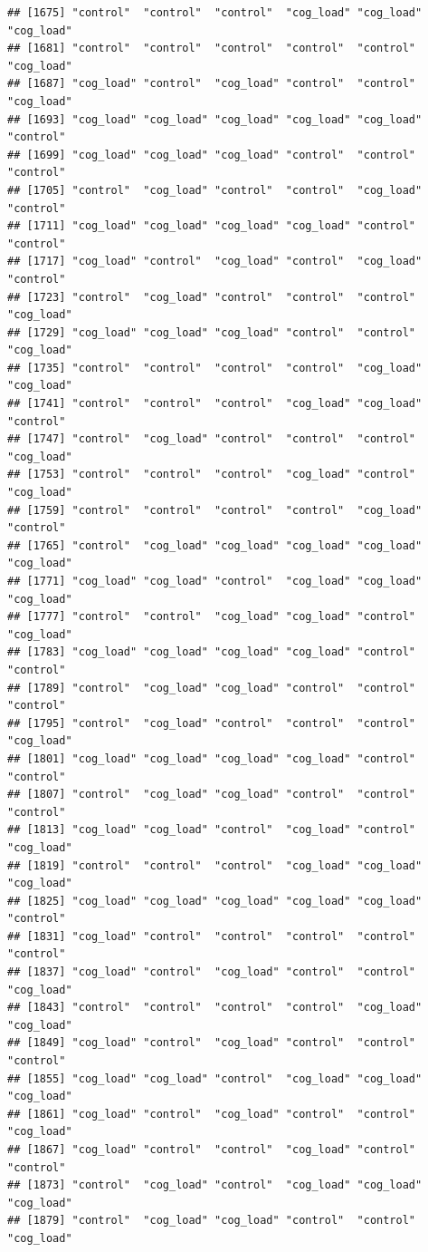 \documentclass[
  american,
  man,floatsintext]{apa7}
\begin{document}
\begin{verbatim}
## [1675] "control"  "control"  "control"  "cog_load" "cog_load" "cog_load"
## [1681] "control"  "control"  "control"  "control"  "control"  "cog_load"
## [1687] "cog_load" "control"  "cog_load" "control"  "control"  "cog_load"
## [1693] "cog_load" "cog_load" "cog_load" "cog_load" "cog_load" "control" 
## [1699] "cog_load" "cog_load" "cog_load" "control"  "control"  "control" 
## [1705] "control"  "cog_load" "control"  "control"  "cog_load" "control" 
## [1711] "cog_load" "cog_load" "cog_load" "cog_load" "control"  "control" 
## [1717] "cog_load" "control"  "cog_load" "control"  "cog_load" "control" 
## [1723] "control"  "cog_load" "control"  "control"  "control"  "cog_load"
## [1729] "cog_load" "cog_load" "cog_load" "control"  "control"  "cog_load"
## [1735] "control"  "control"  "control"  "control"  "cog_load" "cog_load"
## [1741] "control"  "control"  "control"  "cog_load" "cog_load" "control" 
## [1747] "control"  "cog_load" "control"  "control"  "control"  "cog_load"
## [1753] "control"  "control"  "control"  "cog_load" "control"  "cog_load"
## [1759] "control"  "control"  "control"  "control"  "cog_load" "control" 
## [1765] "control"  "cog_load" "cog_load" "cog_load" "cog_load" "cog_load"
## [1771] "cog_load" "cog_load" "control"  "cog_load" "cog_load" "cog_load"
## [1777] "control"  "control"  "cog_load" "cog_load" "control"  "cog_load"
## [1783] "cog_load" "cog_load" "cog_load" "cog_load" "control"  "control" 
## [1789] "control"  "cog_load" "cog_load" "control"  "control"  "control" 
## [1795] "control"  "cog_load" "control"  "control"  "control"  "cog_load"
## [1801] "cog_load" "cog_load" "cog_load" "cog_load" "control"  "control" 
## [1807] "control"  "cog_load" "cog_load" "control"  "control"  "control" 
## [1813] "cog_load" "cog_load" "control"  "cog_load" "control"  "cog_load"
## [1819] "control"  "control"  "control"  "cog_load" "cog_load" "cog_load"
## [1825] "cog_load" "cog_load" "cog_load" "cog_load" "cog_load" "control" 
## [1831] "cog_load" "control"  "control"  "control"  "control"  "control" 
## [1837] "cog_load" "control"  "cog_load" "control"  "control"  "cog_load"
## [1843] "control"  "control"  "control"  "control"  "cog_load" "cog_load"
## [1849] "cog_load" "control"  "cog_load" "control"  "control"  "control" 
## [1855] "cog_load" "cog_load" "control"  "cog_load" "cog_load" "cog_load"
## [1861] "cog_load" "control"  "cog_load" "control"  "control"  "cog_load"
## [1867] "cog_load" "control"  "control"  "cog_load" "control"  "control" 
## [1873] "control"  "cog_load" "control"  "cog_load" "cog_load" "cog_load"
## [1879] "control"  "cog_load" "cog_load" "control"  "control"  "cog_load"

\end{verbatim}
\end{document}
